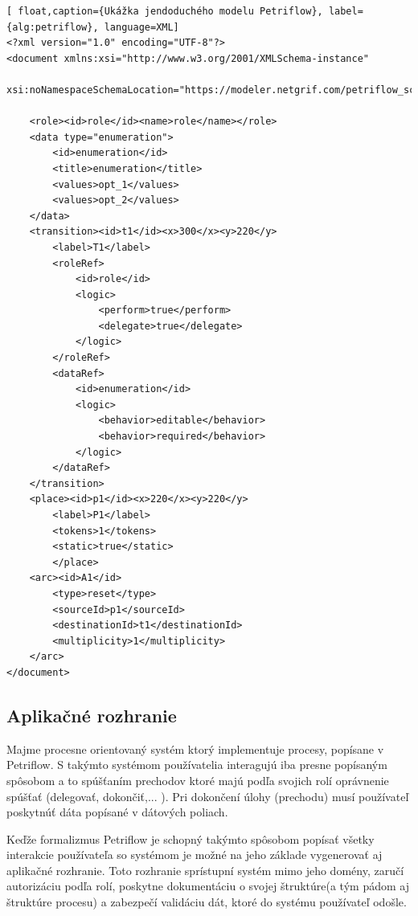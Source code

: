 \begin{lstlisting}[ float,caption={Ukážka jendoduchého modelu Petriflow}, label={alg:petriflow}, language=XML]
<?xml version="1.0" encoding="UTF-8"?>
<document xmlns:xsi="http://www.w3.org/2001/XMLSchema-instance"
          xsi:noNamespaceSchemaLocation="https://modeler.netgrif.com/petriflow_schema.xsd">
          
    <role><id>role</id><name>role</name></role>
    <data type="enumeration"> 
        <id>enumeration</id>
        <title>enumeration</title>
        <values>opt_1</values>
        <values>opt_2</values>
    </data>
    <transition><id>t1</id><x>300</x><y>220</y>
        <label>T1</label>
        <roleRef>
            <id>role</id>
            <logic>
                <perform>true</perform>
                <delegate>true</delegate>
            </logic>
        </roleRef>
        <dataRef> 
            <id>enumeration</id>
            <logic>
                <behavior>editable</behavior>
                <behavior>required</behavior>
            </logic>
        </dataRef>
    </transition>
    <place><id>p1</id><x>220</x><y>220</y>
        <label>P1</label>
        <tokens>1</tokens>
        <static>true</static>
        </place>
    <arc><id>A1</id>
        <type>reset</type>
        <sourceId>p1</sourceId>
        <destinationId>t1</destinationId>
        <multiplicity>1</multiplicity>
    </arc>
</document>
\end{lstlisting}






\subsection{Aplikačné rozhranie}

Majme procesne orientovaný systém ktorý implementuje procesy, popísane v Petriflow. S takýmto systémom používatelia interagujú iba presne popísaným spôsobom a to spúšťaním prechodov ktoré majú podľa svojich rolí oprávnenie spúšťať (delegovať, dokončiť,... ). Pri dokončení úlohy (prechodu) musí používateľ poskytnúť dáta popísané v dátových poliach.

Keďže formalizmus Petriflow je schopný takýmto spôsobom popísať všetky interakcie používateľa so systémom je možné na jeho základe vygenerovať aj aplikačné rozhranie. Toto rozhranie sprístupní systém mimo jeho domény, zaručí autorizáciu podľa rolí, poskytne dokumentáciu o svojej štruktúre(a tým pádom aj štruktúre procesu) a zabezpečí validáciu dát, ktoré do systému používateľ odošle.

